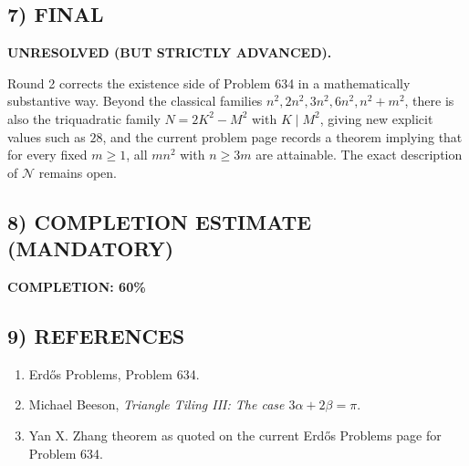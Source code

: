 \subsection*{7) FINAL}
\textbf{UNRESOLVED (BUT STRICTLY ADVANCED).}

Round 2 corrects the existence side of Problem 634 in a mathematically substantive way. Beyond the classical families $n^2,2n^2,3n^2,6n^2,n^2+m^2$, there is also the triquadratic family $N=2K^2-M^2$ with $K\mid M^2$, giving new explicit values such as $28$, and the current problem page records a theorem implying that for every fixed $m\ge 1$, all $mn^2$ with $n\ge 3m$ are attainable. The exact description of $\mathcal N$ remains open.

\subsection*{8) COMPLETION ESTIMATE (MANDATORY)}
\textbf{COMPLETION: 60\%}

\subsection*{9) REFERENCES}
\begin{enumerate}
\item Erd\H{o}s Problems, Problem 634.
\item Michael Beeson, \emph{Triangle Tiling III: The case $3\alpha+2\beta=\pi$}.
\item Yan X. Zhang theorem as quoted on the current Erd\H{o}s Problems page for Problem 634.
\end{enumerate}


